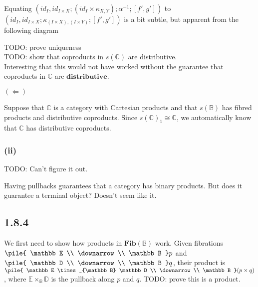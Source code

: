 \documentclass{article}
\newcommand{\mbf}{\mathbf}
\newcommand{\vrt}[2]{
\pile{
#1 \\
\downarrow \\
#2
}
}
\begin{document}
Equating $(id_I, id_{I \times X};(id_I \times \kappa_{X,Y});\alpha^{-1};[f',g'])$ to 
$(id_I, id_{I \times X};\kappa_{(I \times X),(I \times Y)};[f',g'])$ is a bit subtle, but apparent from the following diagram


TODO: prove uniqueness\\
TODO: show that coproducts in $s(\mathbb C)$ are distributive.~\\

Interesting that this would not have worked without the guarantee that coproducts in $\mathbb C$ are $\mbf{distributive}$.

%

$(\Leftarrow)$

Suppose that $\mathbb C$ is a category with Cartesian products and that $s(\mathbb B)$ has fibred products
and distributive coproducts. Since $s(\mathbb C)_1 \cong \mathbb C$, we automatically know that $\mathbb C$ 
has distributive coproducts.

\subsubsection*{(ii)}

TODO: Can't figure it out.

Having pullbacks guarantees that a category has binary products. But does it guarantee a terminal object?
Doesn't seem like it.

\subsection*{1.8.4}

We first need to show how products in $\mbf{Fib}(\mathbb B)$ work. Given fibrations $\vrt{\mathbb E}{\mathbb B}p$ and
$\vrt{\mathbb D}{\mathbb B}q$, their product is $\vrt{\mathbb E \times_{\mathbb B} \mathbb D}{\mathbb B}(p \times q)$, 
where $\mathbb E \times_{\mathbb B} \mathbb D$ is the pullback along $p$ and $q$. TODO: prove this is a product.\\~\\
\end{document}
